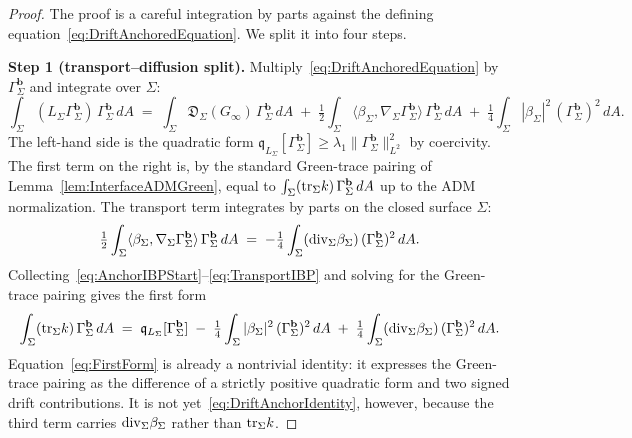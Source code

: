 \begin{proof}
The proof is a careful integration by parts against the defining equation~\eqref{eq:DriftAnchoredEquation}. We split it into four steps.

\textbf{Step 1 (transport--diffusion split).}
Multiply~\eqref{eq:DriftAnchoredEquation} by $\Gamma_\Sigma^{\mathbf b}$ and integrate over $\Sigma$:
\begin{equation}\label{eq:AnchorIBPStart}
    \int_\Sigma (L_\Sigma\Gamma_\Sigma^{\mathbf b})\,\Gamma_\Sigma^{\mathbf b}\,dA
    \;=\;
    \int_\Sigma \mathfrak D_\Sigma(G_\infty)\,\Gamma_\Sigma^{\mathbf b}\,dA
    \;+\;\tfrac12\int_\Sigma\langle\beta_\Sigma,\nabla_\Sigma\Gamma_\Sigma^{\mathbf b}\rangle\,\Gamma_\Sigma^{\mathbf b}\,dA
    \;+\;\tfrac14\int_\Sigma|\beta_\Sigma|^2\,(\Gamma_\Sigma^{\mathbf b})^2\,dA .
\end{equation}
The left-hand side is the quadratic form $\mathfrak q_{L_\Sigma}[\Gamma_\Sigma^{\mathbf b}]\ge\lambda_1\|\Gamma_\Sigma^{\mathbf b}\|_{L^2}^2$ by coercivity. The first term on the right is, by the standard Green-trace pairing of Lemma~\ref{lem:InterfaceADMGreen}, equal to $\int_\Sigma(\mathrm{tr}_\Sigma k)\,\Gamma_\Sigma^{\mathbf b}\,dA$ up to the ADM normalization. The transport term integrates by parts on the closed surface $\Sigma$:
\begin{equation}\label{eq:TransportIBP}
    \tfrac12\int_\Sigma\langle\beta_\Sigma,\nabla_\Sigma\Gamma_\Sigma^{\mathbf b}\rangle\,\Gamma_\Sigma^{\mathbf b}\,dA
    \;=\;-\tfrac14\int_\Sigma(\mathrm{div}_\Sigma\beta_\Sigma)\,(\Gamma_\Sigma^{\mathbf b})^2\,dA .
\end{equation}
Collecting~\eqref{eq:AnchorIBPStart}--\eqref{eq:TransportIBP} and solving for the Green-trace pairing gives the first form
\begin{equation}\label{eq:FirstForm}
    \int_\Sigma (\mathrm{tr}_\Sigma k)\,\Gamma_\Sigma^{\mathbf b}\,dA
    \;=\;
    \mathfrak q_{L_\Sigma}[\Gamma_\Sigma^{\mathbf b}]
    \;-\;\tfrac14\int_\Sigma|\beta_\Sigma|^2\,(\Gamma_\Sigma^{\mathbf b})^2\,dA
    \;+\;\tfrac14\int_\Sigma(\mathrm{div}_\Sigma\beta_\Sigma)\,(\Gamma_\Sigma^{\mathbf b})^2\,dA .
\end{equation}
Equation~\eqref{eq:FirstForm} is already a nontrivial identity: it expresses the Green-trace pairing as the difference of a strictly positive quadratic form and two signed drift contributions. It is not yet~\eqref{eq:DriftAnchorIdentity}, however, because the third term carries $\mathrm{div}_\Sigma\beta_\Sigma$ rather than $\mathrm{tr}_\Sigma k$.


\end{proof}
